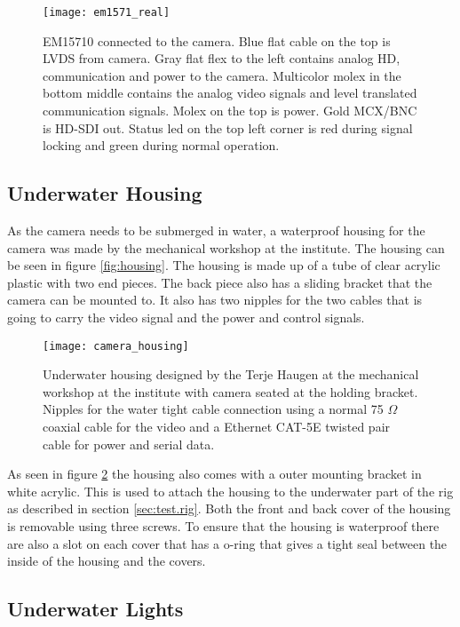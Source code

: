 \begin{figure}
 	\centering
 	\texttt{[image: em1571\_real]}
 	\caption{EM15710 connected to the camera. Blue flat cable on the top is LVDS from camera. Gray flat flex to the left contains 
 		analog HD, communication and power to the camera. Multicolor molex in the bottom middle contains the analog video signals and level translated communication signals. Molex on the top is power. Gold MCX/BNC is HD-SDI out. Status led on the top left corner is red during signal locking and green during normal operation.}
 	\label{fig:hd-sdi.card}
\end{figure}

\subsection{Underwater Housing}
As the camera needs to be submerged in water, a waterproof housing for the camera was made by the mechanical workshop at the institute. The housing can 
be seen in figure \vref{fig:housing}. The housing is made up of a tube of clear acrylic plastic with two end pieces. The back piece also
has a sliding bracket that the camera can be mounted to. It also has two nipples for the two cables that is going to carry the video signal and 
the power and control signals. 

\begin{figure}
 	\centering
 	\texttt{[image: camera\_housing]}
 	\caption{Underwater housing designed by the Terje Haugen at the mechanical workshop at the institute with camera seated at the holding bracket. Nipples for the 
 		water tight cable connection using a normal 75 $\Omega$ coaxial cable for the video and a Ethernet CAT-5E twisted pair cable for power and serial data.}
 	\label{fig:housing}
\end{figure}

As seen in figure \ref{fig:housing} the housing also comes with a outer mounting bracket in white acrylic. This is used to attach the housing to the underwater 
part of the rig as described in section \vref{sec:test.rig}. Both the front and back cover of the housing is removable using three screws. To ensure that 
the housing is waterproof there are also a slot on each cover that has a o-ring that gives a tight seal between the inside of the housing and the covers.

\subsection{Underwater Lights}

